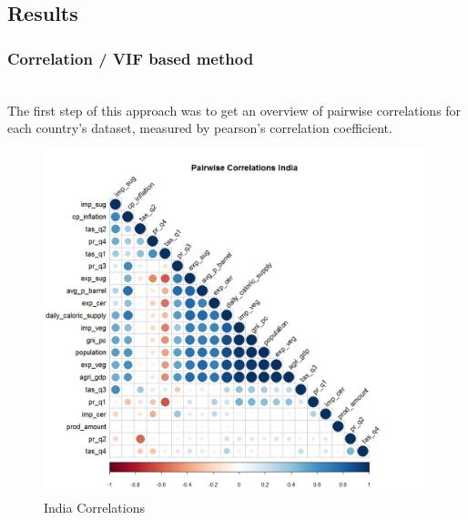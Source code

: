 \documentclass[11pt]{article}
\begin{document}
\subsection{Results}

\subsubsection{Correlation / VIF based method}

\\
The first step of this approach was to get an overview of pairwise correlations for each country’s dataset, measured by pearson’s correlation coefficient.

\FloatBarrier
\begin{figure}[!htb]
\begin{center}
\includegraphics[scale=0.5]{R1.jpg}
\caption{India Correlations}
\label{figure6}
\end{center}
\end{figure}
\FloatBarrier
\end{document}
